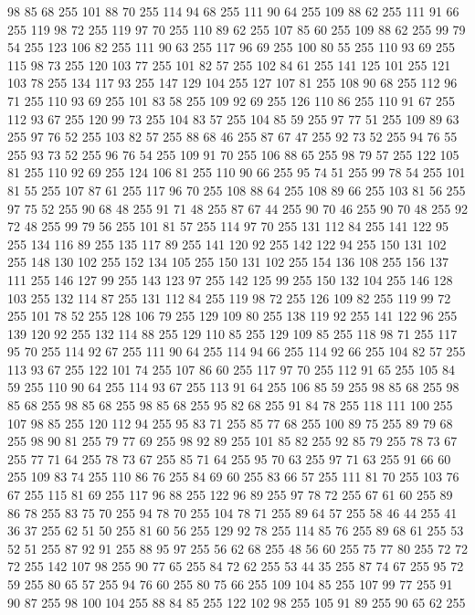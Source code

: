 98 85 68 255 101 88 70 255 114 94 68 255 111 90 64 255 109 88 62 255 111 91 66 255 119 98 72 255 119 97 70 255 110 89 62 255 107 85 60 255 109 88 62 255 99 79 54 255 123 106 82 255 111 90 63 255 117 96 69 255 100 80 55 255 110 93 69 255 115 98 73 255 120 103 77 255 101 82 57 255 102 84 61 255 141 125 101 255 121 103 78 255 134 117 93 255 147 129 104 255 127 107 81 255 108 90 68 255 112 96 71 255 110 93 69 255 101 83 58 255 109 92 69 255 126 110 86 255 110 91 67 255 112 93 67 255 120 99 73 255 104 83 57 255 104 85 59 255 97 77 51 255 109 89 63 255 97 76 52 255 103 82 57 255 88 68 46 255 87 67 47 255 92 73 52 255 94 76 55 255 93 73 52 255 96 76 54 255 109 91 70 255 106 88 65 255 98 79 57 255 122 105 81 255 110 92 69 255 124 106 81 255 110 90 66 255 95 74 51 255 99 78 54 255 101 81 55 255 107 87 61 255 117 96 70 255 108 88 64 255 108 89 66 255 103 81 56 255 97 75 52 255 90 68 48 255
91 71 48 255 87 67 44 255 90 70 46 255 90 70 48 255 92 72 48 255 99 79 56 255 101 81 57 255 114 97 70 255 131 112 84 255 141 122 95 255 134 116 89 255 135 117 89 255 141 120 92 255 142 122 94 255 150 131 102 255 148 130 102 255 152 134 105 255 150 131 102 255 154 136 108 255 156 137 111 255 146 127 99 255 143 123 97 255 142 125 99 255 150 132 104 255 146 128 103 255 132 114 87 255 131 112 84 255 119 98 72 255 126 109 82 255 119 99 72 255 101 78 52 255 128 106 79 255 129 109 80 255 138 119 92 255 141 122 96 255 139 120 92 255 132 114 88 255 129 110 85 255 129 109 85 255 118 98 71 255 117 95 70 255 114 92 67 255 111 90 64 255 114 94 66 255 114 92 66 255 104 82 57 255 113 93 67 255 122 101 74 255 107 86 60 255 117 97 70 255 112 91 65 255 105 84 59 255 110 90 64 255 114 93 67 255 113 91 64 255 106 85 59 255 98 85 68 255 98 85 68 255 98 85 68 255 98 85 68 255 95 82 68 255 91 84 78 255 118 111 100 255 107 98 85 255
120 112 94 255 95 83 71 255 85 77 68 255 100 89 75 255 89 79 68 255 98 90 81 255 79 77 69 255 98 92 89 255 101 85 82 255 92 85 79 255 78 73 67 255 77 71 64 255 78 73 67 255 85 71 64 255 95 70 63 255 97 71 63 255 91 66 60 255 109 83 74 255 110 86 76 255 84 69 60 255 83 66 57 255 111 81 70 255 103 76 67 255 115 81 69 255 117 96 88 255 122 96 89 255 97 78 72 255 67 61 60 255 89 86 78 255 83 75 70 255 94 78 70 255 104 78 71 255 89 64 57 255 58 46 44 255 41 36 37 255 62 51 50 255 81 60 56 255 129 92 78 255 114 85 76 255 89 68 61 255 53 52 51 255 87 92 91 255 88 95 97 255 56 62 68 255 48 56 60 255 75 77 80 255 72 72 72 255 142 107 98 255 90 77 65 255 84 72 62 255 53 44 35 255 87 74 67 255 95 72 59 255 80 65 57 255 94 76 60 255 80 75 66 255 109 104 85 255 107 99 77 255 91 90 87 255 98 100 104 255 88 84 85 255 122 102 98 255 105 91 89 255 90 65 62 255
